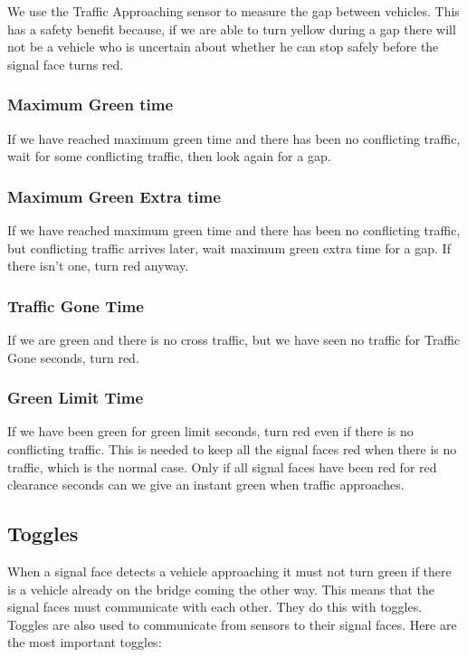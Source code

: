 \documentclass[letterpaper,twoside]{article}
\begin{document}
We use the Traffic Approaching sensor to measure the gap between vehicles.
This has a safety benefit because, if we are able to turn yellow during
a gap there will not be a vehicle who is uncertain about whether he can
stop safely before the signal face turns red.

\subsubsection{Maximum Green time}
If we have reached maximum green time and there has been no conflicting
traffic, wait for some conflicting traffic, then look again for a gap.

\subsubsection{Maximum Green Extra time}
If we have reached maximum green time and there has been no conflicting
traffic, but conflicting traffic arrives later, wait maximum green extra time
for a gap.  If there isn't one, turn red anyway.

\subsubsection{Traffic Gone Time}
If we are green and there is no cross traffic, but we have seen no traffic
for Traffic Gone seconds, turn red.

\subsubsection{Green Limit Time}

If we have been green for green limit seconds, turn red even if there
is no conflicting traffic.  This is needed to keep all the signal faces
red when there is no traffic, which is the normal case.  Only if all
signal faces have been red for red clearance seconds can we give
an instant green when traffic approaches.

\subsection{Toggles}

When a signal face detects a vehicle approaching it must not turn green
if there is a vehicle already on the bridge coming the other way.
This means that the signal faces must communicate with each other.
They do this with toggles.  Toggles are also used to communicate
from sensors to their signal faces.  Here are the most important toggles:
\end{document}
